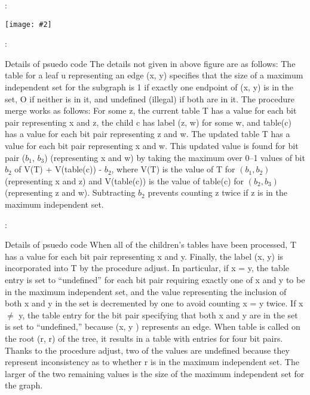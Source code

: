 \documentclass{beamer}
\newcommand{\iph}[2]{
    \texttt{[image: \#2]}
}
\begin{document}
\begin{frame}{\secname : \subsecname}
    \iph{0.9}{lin5}

\end{frame}



\begin{framefont}{\small}
\begin{frame}{\secname : \subsecname}
    \begin{block}{Details of psuedo code}
        The details not given in above figure are as follows: The table for a leaf u
representing an edge (x, y) specifies that the size of a maximum independent
set for the subgraph is 1 if exactly one endpoint of (x, y) is in the set, O if
neither is in it, and undefined (illegal) if both are in it. The procedure merge
works as follows: For some z, the current table T has a value for each bit pair
representing x and z, the child c has label (z, w) for some w, and table(c) has
a value for each bit pair representing z and w. The updated table T has a
value for each bit pair representing x and w. This updated value is found for
bit pair ($b_1$, $b_3$) (representing x and w) by taking the maximum over 0–1 values
of bit $b_2$ of V(T) + V(table(c)) - $b_2$, where V(T) is the value of T for $(b_1, b_2)$
(representing x and z) and V(table(c)) is the value of table(c) for $(b_2, b_3)$
(representing z and w). Subtracting $b_2$ prevents counting z twice if z is in the
maximum independent set. 
    \end{block}
\end{frame}
\end{framefont}

\begin{frame}{\secname : \subsecname}
    \begin{block}{Details of psuedo code}
        When all of the children’s tables have been
        processed, T has a value for each bit pair representing x and y. Finally, the
        label (x, y) is incorporated into T by the procedure adjust. In particular, if
        x = y, the table entry is set to “undefined” for each bit pair requiring exactly
        one of x and y to be in the maximum independent set, and the value
        representing the inclusion of both x and y in the set is decremented by one to
        avoid counting x = y twice. If x $\neq$ y, the table entry for the bit pair specifying
        that both x and y are in the set is set to “undefined,” because (x, y ) represents
        an edge.
        When table is called on the root (r, r) of the tree, it results in a table with
        entries for four bit pairs. Thanks to the procedure adjust, two of the values are
        undefined because they represent inconsistency as to whether r is in the
        maximum independent set. The larger of the two remaining values is the size of
        the maximum independent set for the graph.
    \end{block}
\end{frame}
\end{document}
